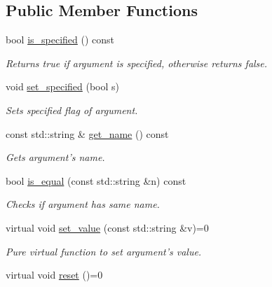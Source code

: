 \subsection*{Public Member Functions}
\begin{DoxyCompactItemize}
\item 
\hypertarget{classcmd_1_1cmd__arg__base_a2f2b037e416eb71c4922e15637a459d9}{bool \hyperlink{classcmd_1_1cmd__arg__base_a2f2b037e416eb71c4922e15637a459d9}{is\-\_\-specified} () const }\label{classcmd_1_1cmd__arg__base_a2f2b037e416eb71c4922e15637a459d9}

\begin{DoxyCompactList}\small\item\em Returns true if argument is specified, otherwise returns false. \end{DoxyCompactList}\item 
void \hyperlink{classcmd_1_1cmd__arg__base_a6e2d899a1e0cb0a8babbcb2dceda7a85}{set\-\_\-specified} (bool s)
\begin{DoxyCompactList}\small\item\em Sets specified flag of argument. \end{DoxyCompactList}\item 
const std\-::string \& \hyperlink{classcmd_1_1cmd__arg__base_ab68609a393e1be2f50199a6af09ce107}{get\-\_\-name} () const 
\begin{DoxyCompactList}\small\item\em Gets argument's name. \end{DoxyCompactList}\item 
bool \hyperlink{classcmd_1_1cmd__arg__base_a217bfd2e37d9d45366e2ae649364f4e3}{is\-\_\-equal} (const std\-::string \&n) const 
\begin{DoxyCompactList}\small\item\em Checks if argument has same name. \end{DoxyCompactList}\item 
virtual void \hyperlink{classcmd_1_1cmd__arg__base_a2767ec77135f82eac5f3ca754b24acff}{set\-\_\-value} (const std\-::string \&v)=0
\begin{DoxyCompactList}\small\item\em Pure virtual function to set argument's value. \end{DoxyCompactList}\item 
\hypertarget{classcmd_1_1cmd__arg__base_a6d3b76394a6fb601e4e50cf349e60436}{virtual void \hyperlink{classcmd_1_1cmd__arg__base_a6d3b76394a6fb601e4e50cf349e60436}{reset} ()=0}\label{classcmd_1_1cmd__arg__base_a6d3b76394a6fb601e4e50cf349e60436}


\end{DoxyCompactItemize}
